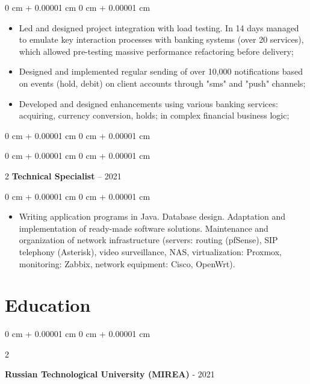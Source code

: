\documentclass[10pt, letterpaper]{article}
\newenvironment{highlights}{
    \begin{itemize}[
        topsep=0.10 cm,
        parsep=0.10 cm,
        partopsep=0pt,
        itemsep=0pt,
        leftmargin=0 cm + 10pt
    ]
}{
    \end{itemize}
} %
\newenvironment{onecolentry}{
    \begin{adjustwidth}{
        0 cm + 0.00001 cm
    }{
        0 cm + 0.00001 cm
    }
}{
    \end{adjustwidth}
} %
\newenvironment{twocolentry}[2][]{
    \onecolentry
    \def\secondColumn{#2}
    \setcolumnwidth{\fill, 4.5 cm}
    \begin{paracol}{2}
}{
    \switchcolumn \raggedleft \secondColumn
    \end{paracol}
    \endonecolentry
} %
\begin{document}
         \begin{onecolentry}
                \begin{highlights}
                    \item Led and designed project integration with load testing. In 14 days managed to emulate key interaction processes with banking systems (over 20 services), which allowed pre-testing massive performance refactoring before delivery;
                    \item Designed and implemented regular sending of over 10,000 notifications based on events (hold, debit) on client accounts through "sms" and "push" channels;
                    \item Developed and designed enhancements using various banking services: acquiring, currency conversion, holds; in complex financial business logic;     
                \end{highlights}
            \end{onecolentry}
            
\vspace{0.20 cm}

\hdashrule[0.1ex]{\textwidth}{0.2pt}{5mm 2mm}


     \begin{onecolentry}{} 
     \fontsize{12 pt}{12 pt}
     \selectfont{Department of Engineering and Technical Security at RTU MIREA}
     \end{onecolentry}
     
\vspace{0.20 cm}
         \begin{twocolentry}{
                2017 – 2021
            } \textbf{Technical Specialist}\end{twocolentry}
\vspace{0.20 cm}
    \begin{onecolentry}
                \begin{highlights}
                    \item Writing application programs in Java. Database design. Adaptation and implementation of ready-made software solutions. Maintenance and organization of network infrastructure (servers: routing (pfSense), SIP telephony (Asterisk), video surveillance, NAS, virtualization: Proxmox, monitoring: Zabbix, network equipment: Cisco, OpenWrt).      
                \end{highlights}
            \end{onecolentry}

    \section{Education}
        \begin{twocolentry}{
            2017 - 2021
        }
            \textbf{Russian Technological University (MIREA)}\end{twocolentry}
    
\end{document}
